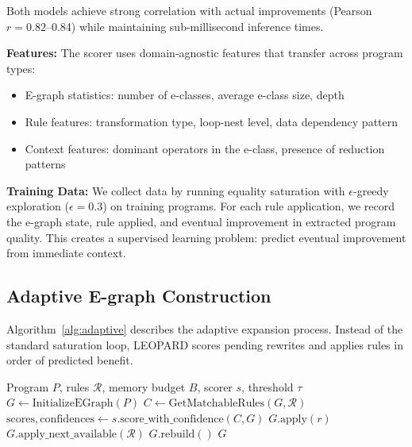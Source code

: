 \documentclass{article}
\begin{document}
Both models achieve strong correlation with actual improvements (Pearson $r = 0.82$--0.84) while maintaining sub-millisecond inference times.

\textbf{Features:} The scorer uses domain-agnostic features that transfer across program types:
\begin{itemize}
    \item E-graph statistics: number of e-classes, average e-class size, depth
    \item Rule features: transformation type, loop-nest level, data dependency pattern
    \item Context features: dominant operators in the e-class, presence of reduction patterns
\end{itemize}

\textbf{Training Data:} We collect data by running equality saturation with $\epsilon$-greedy exploration ($\epsilon = 0.3$) on training programs. For each rule application, we record the e-graph state, rule applied, and eventual improvement in extracted program quality. This creates a supervised learning problem: predict eventual improvement from immediate context.

\subsection{Adaptive E-graph Construction}

Algorithm~\ref{alg:adaptive} describes the adaptive expansion process. Instead of the standard saturation loop, LEOPARD scores pending rewrites and applies rules in order of predicted benefit.

\begin{algorithm}[t]
\caption{Adaptive E-graph Expansion}
\label{alg:adaptive}
\begin{algorithmic}[1]
\Require Program $P$, rules $\mathcal{R}$, memory budget $B$, scorer $s$, threshold $\tau$
\State $G \gets \text{InitializeEGraph}(P)$
    \State $C \gets \text{GetMatchableRules}(G, \mathcal{R})$
    \State $\text{scores}, \text{confidences} \gets s.\text{score\_with\_confidence}(C, G)$
            \State $G.\text{apply}(r)$
        \Else
            \State $G.\text{apply\_next\_available}(\mathcal{R})$ 
        \EndIf
    \EndFor
    \State $G.\text{rebuild}()$
\EndWhile
\State \Return $G$
\end{algorithmic}
\end{algorithm}
\end{document}
